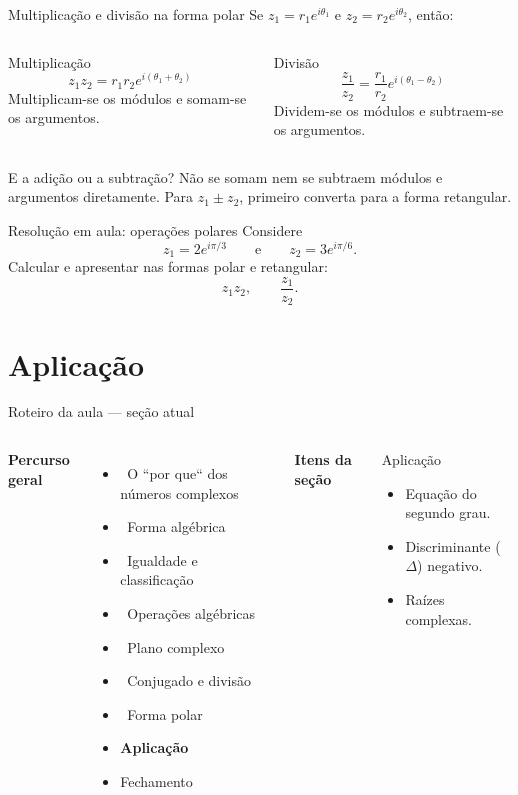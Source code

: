 \documentclass[aspectratio=169]{beamer}
\newcommand{\EspacoEscrita}[1]{%
  \vspace{0.25em}
  \begin{minipage}[t][#1][t]{\linewidth}
  \end{minipage}
}
\newcommand{\secaoPassada}[1]{{\color{ThemeSecondary}\checkmark\ #1}}
\newcommand{\secaoAtual}[1]{{\color{ThemeAccent}\textbf{\large #1}}}
\newcommand{\secaoFutura}[1]{{\color{ThemeDark!55}#1}}
\newcommand{\MapaSecao}[3]{%
\begin{frame}{Roteiro da aula — seção atual}
\vspace{-0.55em}
\begin{columns}[T,onlytextwidth]
\column{0.54\textwidth}
\footnotesize
\textbf{Percurso geral}\par\vspace{0.25em}
#1
\column{0.03\textwidth}
\column{0.35\textwidth}
\footnotesize
\textbf{Itens da seção}\par\vspace{0.25cm}
\begin{block}{#2}
#3
\end{block}
\column{0.03\textwidth}
\end{columns}
\end{frame}
}
\begin{document}
\begin{frame}{Multiplicação e divisão na forma polar}
\vspace{-0.5em}
\small
Se $z_1=r_1e^{i\theta_1}$ e $z_2=r_2e^{i\theta_2}$, então:
\begin{columns}[T,onlytextwidth]
\begin{block}{Multiplicação}
\[
  z_1z_2=r_1r_2e^{i(\theta_1+\theta_2)}
\]
Multiplicam-se os módulos e somam-se os argumentos.
\end{block}
\begin{block}{Divisão}
\[
  \frac{z_1}{z_2}=\frac{r_1}{r_2}e^{i(\theta_1-\theta_2)}
\]
Dividem-se os módulos e subtraem-se os argumentos.
\end{block}
\end{columns}
\begin{alertblock}{E a adição ou a subtração?}
Não se somam nem se subtraem módulos e argumentos diretamente. Para $z_1\pm z_2$, primeiro converta para a forma retangular.
\end{alertblock}
\end{frame}

\begin{frame}{Resolução em aula: operações polares}
\vspace{-0.3em}
\small
Considere
\[
  z_1=2e^{i\pi/3}\qquad\text{e}\qquad z_2=3e^{i\pi/6}.
\]
Calcular e apresentar nas formas polar e retangular:
\[
  z_1z_2,\qquad \frac{z_1}{z_2}.
\]
\EspacoEscrita{0.42\textheight}
\end{frame}

\section{Aplicação}

\MapaSecao{
\begin{itemize}
  \item \secaoPassada{O ``por que`` dos números complexos}
  \item \secaoPassada{Forma algébrica}
  \item \secaoPassada{Igualdade e classificação}
  \item \secaoPassada{Operações algébricas}
  \item \secaoPassada{Plano complexo}
  \item \secaoPassada{Conjugado e divisão}
  \item \secaoPassada{Forma polar}
  \item \secaoAtual{Aplicação}
  \item \secaoFutura{Fechamento}
\end{itemize}
}{Aplicação}{
\begin{itemize}
  \item Equação do segundo grau.
  \item Discriminante ($\Delta$) negativo.
  \item Raízes complexas.
\end{itemize}
}
\end{document}
